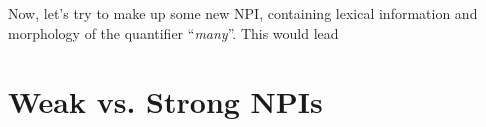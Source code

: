 \documentclass[a4paper,11pt]{article}
\begin{document}
Now, let's try to make up some new NPI, containing lexical information and morphology of the quantifier \enquote{\emph{many}}. This would lead
\section{Weak vs. Strong NPIs}
\end{document}
